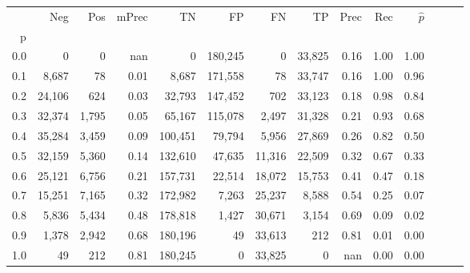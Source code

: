 \begin{tabular}{rrrrrrrrrrrrrr}
\toprule
{} &     Neg &    Pos & mPrec &       TN &       FP &      FN &      TP &  Prec &   Rec & $\hat{p}$ \\
p   &         &        &       &          &          &         &         &       &       &           \\
\midrule
0.0 &       0 &      0 &   nan &        0 &  180,245 &       0 &  33,825 &  0.16 &  1.00 &      1.00 \\
0.1 &   8,687 &     78 &  0.01 &    8,687 &  171,558 &      78 &  33,747 &  0.16 &  1.00 &      0.96 \\
0.2 &  24,106 &    624 &  0.03 &   32,793 &  147,452 &     702 &  33,123 &  0.18 &  0.98 &      0.84 \\
0.3 &  32,374 &  1,795 &  0.05 &   65,167 &  115,078 &   2,497 &  31,328 &  0.21 &  0.93 &      0.68 \\
0.4 &  35,284 &  3,459 &  0.09 &  100,451 &   79,794 &   5,956 &  27,869 &  0.26 &  0.82 &      0.50 \\
0.5 &  32,159 &  5,360 &  0.14 &  132,610 &   47,635 &  11,316 &  22,509 &  0.32 &  0.67 &      0.33 \\
0.6 &  25,121 &  6,756 &  0.21 &  157,731 &   22,514 &  18,072 &  15,753 &  0.41 &  0.47 &      0.18 \\
0.7 &  15,251 &  7,165 &  0.32 &  172,982 &    7,263 &  25,237 &   8,588 &  0.54 &  0.25 &      0.07 \\
0.8 &   5,836 &  5,434 &  0.48 &  178,818 &    1,427 &  30,671 &   3,154 &  0.69 &  0.09 &      0.02 \\
0.9 &   1,378 &  2,942 &  0.68 &  180,196 &       49 &  33,613 &     212 &  0.81 &  0.01 &      0.00 \\
1.0 &      49 &    212 &  0.81 &  180,245 &        0 &  33,825 &       0 &   nan &  0.00 &      0.00 \\
\bottomrule
\end{tabular}
